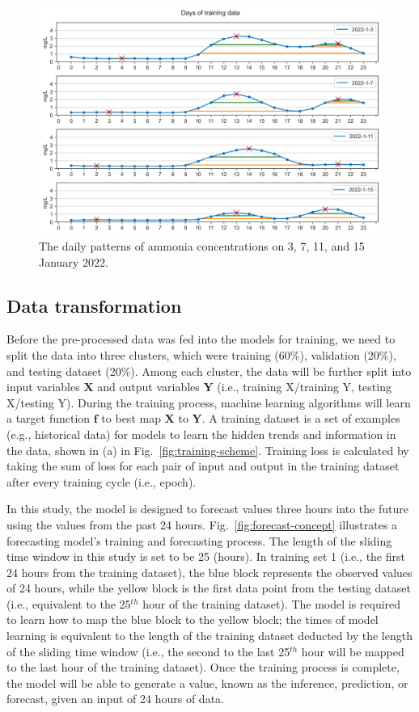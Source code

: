 \begin{figure}[!ht]
  \centering
  \includegraphics[width=0.8\columnwidth]{imgs/results/nh3-pattern.png}
  \caption{The daily patterns of ammonia concentrations on 3, 7, 11, and 15 January 2022.}
  \label{fig:nh3-peak-pattern}
\end{figure}


\subsection{Data transformation}
Before the pre-processed data was fed into the models for training, we need to split the data into three clusters, which were training (60\%), validation (20\%), and testing dataset (20\%). Among each cluster, the data will be further split into input variables $\bm{X}$ and output variables $\bm{Y}$ (i.e., training X/training Y, testing X/testing Y). During the training process, machine learning algorithms will learn a target function $\bm{f}$ to best map $\bm{X}$ to $\bm{Y}$. A training dataset is a set of examples (e.g., historical data) for models to learn the hidden trends and information in the data, shown in (a) in Fig.~\ref{fig:training-scheme}. Training loss is calculated by taking the sum of loss for each pair of input and output in the training dataset after every training cycle (i.e., epoch).

In this study, the model is designed to forecast values three hours into the future using the values from the past 24 hours. Fig.~\ref{fig:forecast-concept} illustrates a forecasting model's training and forecasting process. The length of the sliding time window in this study is set to be 25 (hours). In training set 1 (i.e., the first 24 hours from the training dataset), the blue block represents the observed values of 24 hours, while the yellow block is the first data point from the testing dataset (i.e., equivalent to the 25$^{th}$ hour of the training dataset). The model is required to learn how to map the blue block to the yellow block; the times of model learning is equivalent to the length of the training dataset deducted by the length of the sliding time window (i.e., the second to the last 25$^{th}$ hour will be mapped to the last hour of the training dataset). Once the training process is complete, the model will be able to generate a value, known as the inference, prediction, or forecast, given an input of 24 hours of data.

